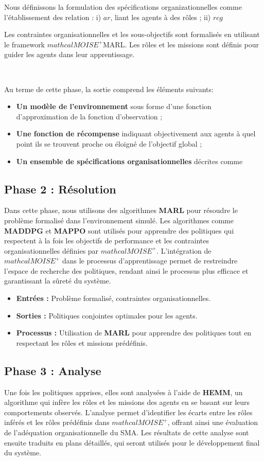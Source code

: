 \documentclass[sigconf,anonymous]{aamas}
\begin{document}
\noindent Nous définissons la formulation des spécifications organizationnelles comme l'établissement des relation : \quad i) $ar$, liant les agents à des rôles ; \quad ii) $rcg$

Les contraintes organisationnelles et les sous-objectifs sont formalisés en utilisant le framework $mathcal{M}OISE^+$MARL. Les rôles et les missions sont définis pour guider les agents dans leur apprentissage.

\

Au terme de cette phase, la sortie comprend les éléments suivants:
\begin{itemize}
    \item \textbf{Un modèle de l'environnement} sous forme d'une fonction d'approximation de la fonction d'observation ;
    \item \textbf{Une fonction de récompense} indiquant objectivement aux agents à quel point ils se trouvent proche ou éloigné de l'objectif global ;
    \item \textbf{Un ensemble de spécifications organisationnelles} décrites comme 
\end{itemize}

\subsection{Phase 2 : Résolution}
Dans cette phase, nous utilisons des algorithmes \textbf{MARL} pour résoudre le problème formalisé dans l'environnement simulé. Les algorithmes comme \textbf{MADDPG} et \textbf{MAPPO} sont utilisés pour apprendre des politiques qui respectent à la fois les objectifs de performance et les contraintes organisationnelles définies par \textbf{$mathcal{M}OISE^+$}. L'intégration de \textbf{$mathcal{M}OISE^+$} dans le processus d'apprentissage permet de restreindre l'espace de recherche des politiques, rendant ainsi le processus plus efficace et garantissant la sûreté du système.

\begin{itemize}
  \item \textbf{Entrées :} Problème formalisé, contraintes organisationnelles.
  \item \textbf{Sorties :} Politiques conjointes optimales pour les agents.
  \item \textbf{Processus :} Utilisation de \textbf{MARL} pour apprendre des politiques tout en respectant les rôles et missions prédéfinis.
\end{itemize}

\subsection{Phase 3 : Analyse}
Une fois les politiques apprises, elles sont analysées à l'aide de \textbf{HEMM}, un algorithme qui infère les rôles et les missions des agents en se basant sur leurs comportements observés. L'analyse permet d'identifier les écarts entre les rôles inférés et les rôles prédéfinis dans \textbf{$mathcal{M}OISE^+$}, offrant ainsi une évaluation de l'adéquation organisationnelle du SMA. Les résultats de cette analyse sont ensuite traduits en plans détaillés, qui seront utilisés pour le développement final du système.
\end{document}
